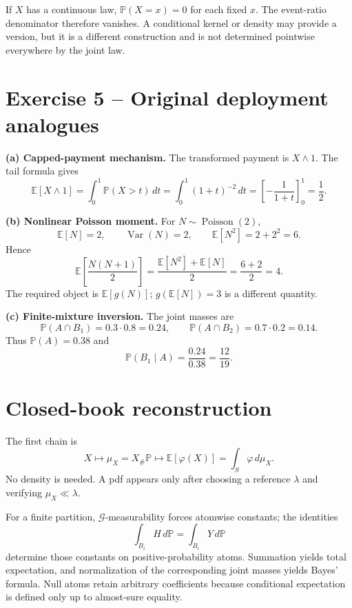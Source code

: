 If $X$ has a continuous law, $\mathbb P(X=x)=0$ for each fixed $x$. The event-ratio denominator therefore vanishes. A conditional kernel or density may provide a version, but it is a different construction and is not determined pointwise everywhere by the joint law.

\section*{Exercise 5 -- Original deployment analogues}

\textbf{(a) Capped-payment mechanism.}
The transformed payment is $X\wedge1$. The tail formula gives
\[
\mathbb E[X\wedge1]
=
\int_0^1\mathbb P(X>t)\,dt
=
\int_0^1(1+t)^{-2}\,dt
=
\left[-\frac1{1+t}\right]_0^1
=
\frac12.
\]

\textbf{(b) Nonlinear Poisson moment.}
For $N\sim\operatorname{Poisson}(2)$,
\[
\mathbb E[N]=2,
\qquad
\operatorname{Var}(N)=2,
\qquad
\mathbb E[N^2]=2+2^2=6.
\]
Hence
\[
\mathbb E\!\left[\frac{N(N+1)}2\right]
=
\frac{\mathbb E[N^2]+\mathbb E[N]}2
=
\frac{6+2}{2}
=
4.
\]
The required object is $\mathbb E[g(N)]$; $g(\mathbb E[N])=3$ is a different quantity.

\textbf{(c) Finite-mixture inversion.}
The joint masses are
\[
\mathbb P(A\cap B_1)=0.3\cdot0.8=0.24,
\qquad
\mathbb P(A\cap B_2)=0.7\cdot0.2=0.14.
\]
Thus $\mathbb P(A)=0.38$ and
\[
\mathbb P(B_1\mid A)
=
\frac{0.24}{0.38}
=
\frac{12}{19}.
\]

\section*{Closed-book reconstruction}

The first chain is
\[
X
\longmapsto
\mu_X=X_\#\mathbb P
\longmapsto
\mathbb E[\varphi(X)]=\int_S\varphi\,d\mu_X.
\]
No density is needed. A pdf appears only after choosing a reference $\lambda$ and verifying $\mu_X\ll\lambda$.

For a finite partition, $\mathcal G$-measurability forces atomwise constants; the identities
\[
\int_{B_i}H\,d\mathbb P
=
\int_{B_i}Y\,d\mathbb P
\]
determine those constants on positive-probability atoms. Summation yields total expectation, and normalization of the corresponding joint masses yields Bayes' formula. Null atoms retain arbitrary coefficients because conditional expectation is defined only up to almost-sure equality.
